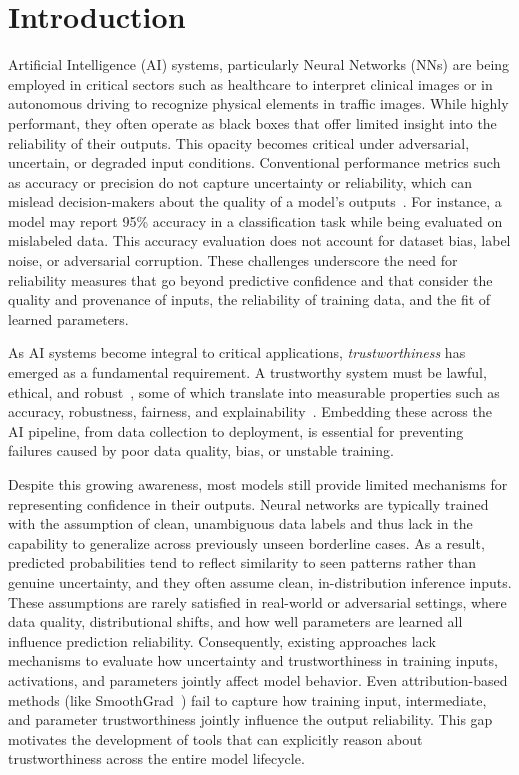 \vspace{-0.5em}
\section{Introduction}

Artificial Intelligence (AI) systems, particularly Neural Networks (NNs) are being employed in critical sectors such as healthcare to interpret clinical images or in autonomous driving to recognize physical elements in traffic images. While highly performant, they often operate as black boxes that offer limited insight into the reliability of their outputs. This opacity becomes critical under adversarial, uncertain, or degraded input conditions. Conventional performance metrics such as accuracy or precision do not capture uncertainty or reliability, which can mislead decision-makers about the quality of a model’s outputs~\cite{10.1145/3290605.3300509}. For instance, a model may report 95\% accuracy in a classification task while being evaluated on mislabeled data. This accuracy evaluation does not account for dataset bias, label noise, or adversarial corruption. These challenges underscore the need for reliability measures that go beyond predictive confidence and that consider the quality and provenance of inputs, the reliability of training data, and the fit of learned parameters.

As AI systems become integral to critical applications, \emph{trustworthiness} has emerged as a fundamental requirement. A trustworthy system must be lawful, ethical, and robust~\cite{ec2019ethics}, some of which translate into measurable properties such as accuracy, robustness, fairness, and explainability~\cite{10.3389/fdata.2024.1467222}. Embedding these across the AI pipeline, from data collection to deployment, is essential for preventing failures caused by poor data quality, bias, or unstable training. 

Despite this growing awareness, most models still provide limited mechanisms for representing confidence in their outputs. Neural networks are typically trained with the assumption of clean, unambiguous data labels and thus lack in the capability to generalize across previously unseen borderline cases. As a result, predicted probabilities tend to reflect similarity to seen patterns rather than genuine uncertainty, and they often assume clean, in-distribution inference inputs. These assumptions are rarely satisfied in real-world or adversarial settings, where data quality, distributional shifts, and how well parameters are learned all influence prediction reliability. Consequently, existing approaches lack mechanisms to evaluate how uncertainty and trustworthiness in training inputs, activations, and parameters jointly affect model behavior. Even attribution-based methods (like SmoothGrad~\cite{smilkov2017smoothgradremovingnoiseadding}) fail to capture how training input, intermediate, and parameter trustworthiness jointly influence the output reliability. This gap motivates the development of tools that can explicitly reason about trustworthiness across the entire model lifecycle.

